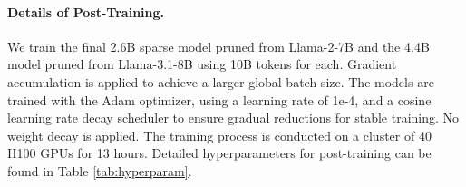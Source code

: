    

\paragraph{Details of Post-Training.} We train the final 2.6B sparse model pruned from Llama-2-7B and the 4.4B model pruned from Llama-3.1-8B using 10B tokens for each. Gradient accumulation is applied to achieve a larger global batch size. The models are trained with the Adam optimizer, using a learning rate of 1e-4, and a cosine learning rate decay scheduler to ensure gradual reductions for stable training. No weight decay is applied. The training process is conducted on a cluster of 40 H100 GPUs for 13 hours. Detailed hyperparameters for post-training can be found in Table \ref{tab:hyperparam}.



